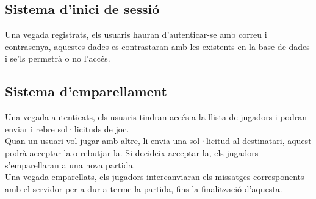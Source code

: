 \subsection{Sistema d'inici de sessió}
Una vegada registrats, els usuaris hauran d’autenticar-se amb correu i contrasenya, aquestes dades es contrastaran amb les existents en la base de dades i se'ls permetrà o no l'accés.
\subsection{Sistema d'emparellament}
Una vegada autenticats, els usuaris tindran accés a la llista de jugadors i podran enviar i rebre sol·licituds de joc. 
\\[3mm]
Quan un usuari vol jugar amb altre, li envia una sol·licitud al destinatari, aquest podrà acceptar-la o rebutjar-la. Si decideix acceptar-la, els jugadors s'emparellaran a una nova partida.
\\[3mm]
Una vegada emparellats, els jugadors intercanviaran els missatges corresponents amb el servidor per a dur a terme la partida, fins la finalització d'aquesta.
